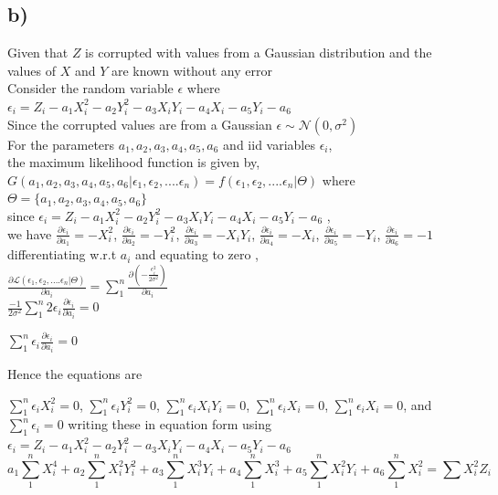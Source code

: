 \documentclass{article}
\begin{document}
\subsection*{b)}
Given that $Z$ is corrupted with values from a Gaussian distribution and the values of $X $ and $Y$ are known without any error\\
Consider the random variable $\epsilon$ where $\epsilon_i = Z_i - a_1X_i^2 - a_2Y_i^2 - a_3X_iY_i - a_4X_i -a_5Y_i -a_6$\\
Since the corrupted values are from a Gaussian $\epsilon \sim \mathcal{N}(0,\sigma^2)$\\
For the parameters $a_1,a_2,a_3,a_4,a_5,a_6$ and iid variables $\epsilon_i$,\\ the maximum likelihood function is given by,\\
$G(a_1,a_2,a_3,a_4,a_5,a_6|\epsilon_1,\epsilon_2,....\epsilon_n) = f(\epsilon_1,\epsilon_2,....\epsilon_n | \Theta )$ where $\Theta = \{{a_1,a_2,a_3,a_4,a_5,a_6}\}$\\
since $\epsilon_i =  Z_i - a_1X_i^2 - a_2Y_i^2 - a_3X_iY_i - a_4X_i -a_5Y_i -a_6$ ,\\ we have $\frac{\partial {\epsilon_i}}{\partial a_1} = -X_i^2$, $\frac{\partial {\epsilon_i}}{\partial a_2} = -Y_i^2$, $\frac{\partial {\epsilon_i}}{\partial a_3} = -X_iY_i $, $\frac{\partial {\epsilon_i}}{\partial a_4} = -X_i $, $\frac{\partial {\epsilon_i}}{\partial a_5} = -Y_i $, $\frac{\partial {\epsilon_i}}{\partial a_6} = -1 $\\
differentiating w.r.t $a_i$ and equating to zero ,\\
$\frac{\partial \mathcal{L}(\epsilon_1,\epsilon_2,....\epsilon_n | \Theta )}{\partial a_i} = \sum_1^n \frac{\partial (-\frac{\epsilon_i^2}{2\sigma^2})}{\partial a_i}$\\
$\frac{-1}{2\sigma^2} \sum_1^n 2\epsilon_i \frac{\partial {\epsilon_i}}{\partial a_i} = 0$\par 
$\sum_1^n \epsilon_i \frac{\partial {\epsilon_i}}{\partial a_i} = 0$\par 
Hence the equations are\par 
$\sum_1^n \epsilon_i X_i^2 =0$, $\sum_1^n \epsilon_i Y_i^2 =0$, $\sum_1^n \epsilon_i X_iY_i =0$, $\sum_1^n \epsilon_i X_i =0$, $\sum_1^n \epsilon_i X_i =0$, and  $\sum_1^n \epsilon_i =0$
writing these in equation form using $\epsilon_i = Z_i - a_1X_i^2 - a_2Y_i^2 - a_3X_iY_i - a_4X_i -a_5Y_i -a_6$\\
\begin{equation}
a_1 \sum_1^n X_i^4 + a_2 \sum_1^n X_i^2Y_i^2 + a_3 \sum_1^n X_i^3Y_i + a_4 \sum_1^n X_i^3 +a_5 \sum_1^n X_i^2Y_i + a_6 \sum_1^n X_i^2= \sum X_i^2Z_i
\end{equation}
\end{document}
